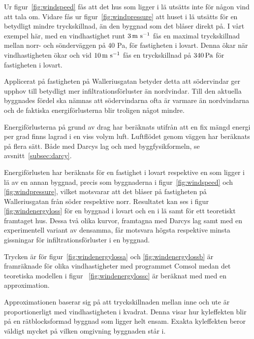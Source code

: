 Ur figur~\ref{fig:windspeed} fås att det hus som ligger i lä utsätts inte för någon vind att tala om.
 Vidare fås ur figur~\ref{fig:windpressure} att huset i lä utsätts för en betydligt mindre 
 tryckskillnad, än den byggnad som det blåser direkt på. I vårt exempel här, med en 
 vindhastighet runt $\unit[3]{m~s^{-1}}$ fås en maximal tryckskillnad mellan norr- och sönderväggen 
 på 40 Pa, för fastigheten i lovart. Denna ökar när vindhastigheten ökar och vid $\unit[10]{m~s^{-1}}$ fås en 
 tryckskillnad på $\unit[340]{Pa}$ för fastigheten i lovart. 

Applicerat på fastigheten på Walleriusgatan betyder detta att södervindar ger upphov till 
betydligt mer infiltrationsförluster än nordvindar. Till den aktuella byggnades fördel ska nämnas 
att södervindarna ofta är varmare än nordvindarna och de faktiska energiförlusterna blir 
troligen något mindre.


Energiförlusterna på grund av drag har beräknats utifrån att en fix mängd energi per grad finns lagrad i en viss volym luft. Luftflödet genom väggen har beräknats på flera sätt. Både med Darcys lag och med byggfysikformeln, se avsnitt~\ref{subsec:darcy}.

Energiförlusten har beräknats
  för en fastighet i lovart respektive en som ligger i lä av en annan byggnad, precis som 
  byggnaderna i figur~\ref{fig:windspeed} och \ref{fig:windpressure}, vilket motsvarar att det 
  blåser på fastigheten på Walleriusgatan från söder respektive norr. Resultatet kan ses i figur~
  \ref{fig:windenergyloss} för en byggnad i lovart och en i lä samt för ett teoretiskt framtaget hus. Dessa två olika kurvor, framtagna med Darcys lag samt med en experimentell variant av densamma, får motsvara högsta respektive minsta gissningar för infiltrationsförluster i en byggnad.

Trycken är för figur~\ref{fig:windenergylossa} och \ref{fig:windenergylossb} är framräknade för 
olika vindhastigheter med programmet Comsol medan det teoretiska modellen i figur~
\ref{fig:windenergylossc} är beräknat med med en approximation. 

Approximationen baserar sig
 på att tryckskillnaden mellan inne och ute är proportionerligt med vindhastigheten i kvadrat. Denna visar hur kyleffekten blir på en rätblocksformad byggnad som ligger helt ensam. Exakta kyleffekten beror väldigt mycket på vilken omgivning byggnaden står i.


